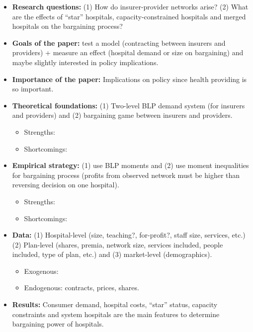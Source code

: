 \begin{itemize}
\item \textbf{Research questions:} (1) How do insurer-provider networks arise? (2) What are the effects of ``star'' hospitals, capacity-constrained hospitals and merged hospitals on the bargaining process?
\item \textbf{Goals of the paper:} test a model (contracting between insurers and providers) + measure an effect (hospital demand or size on bargaining) and maybe slightly interested in policy implications.
\item \textbf{Importance of the paper:} Implications on policy since health providing is so important.
\item \textbf{Theoretical foundations:} (1) Two-level BLP demand system (for insurers and providers) and (2) bargaining game between insurers and providers. \begin{itemize}
\item Strengths: 
\item Shortcomings:
\end{itemize}
\item \textbf{Empirical strategy:} (1) use BLP moments and (2) use moment inequalities for bargaining process (profits from observed network must be higher than reversing decision on one hospital).\begin{itemize}
\item Strengths: 
\item Shortcomings: 
\end{itemize}
\item \textbf{Data:} (1) Hospital-level (size, teaching?, for-profit?, staff size, services, etc.) (2) Plan-level (shares, premia, network size, services included, people included, type of plan, etc.) and (3) market-level (demographics).
\begin{itemize}
\item Exogenous: 
\item Endogenous: contracts, prices, shares.
\end{itemize}
\item \textbf{Results:}  Consumer demand, hospital costs, ``star'' status, capacity constraints and system hospitals are the main features to determine bargaining power of hospitals. 
\end{itemize}